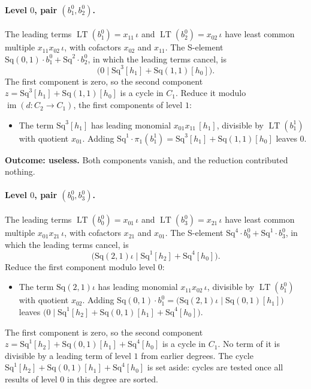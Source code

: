 \documentclass[11pt]{article}
\newcommand{\Sq}{\mathrm{Sq}}
\DeclareMathOperator{\LT}{LT}
\begin{document}
\paragraph{Level $0$, pair $(b^{0}_{1}, b^{0}_{2})$.} The leading terms $\LT(b^{0}_{1}) = x_{11}\,\iota$ and $\LT(b^{0}_{2}) = x_{02}\,\iota$ have least common multiple $x_{11}x_{02}\,\iota$, with cofactors $x_{02}$ and $x_{11}$. The S-element $\Sq(0,1)\cdot b^{0}_{1} + \Sq^{2}\cdot b^{0}_{2}$, in which the leading terms cancel, is
\[\bigl(0 \;\big|\; \Sq^{3}[h_1] + \Sq(1,1)[h_0]\bigr).\]
The first component is zero, so the second component $z = \Sq^{3}[h_1] + \Sq(1,1)[h_0]$ is a cycle in $C_{1}$.
Reduce it modulo $\operatorname{im}(d\colon C_{2}\to C_{1})$, the first components of level $1$:
\begin{itemize}
\item The term $\Sq^{3}[h_1]$ has leading monomial $x_{01}x_{11}\,[h_1]$, divisible by $\LT(b^{1}_{1})$ with quotient $x_{01}$. Adding $\Sq^{1}\cdot \pi_1(b^{1}_{1}) = \Sq^{3}[h_1] + \Sq(1,1)[h_0]$ leaves $0$.
\end{itemize}
\textbf{Outcome: useless.} Both components vanish, and the reduction contributed nothing.
\medskip
\paragraph{Level $0$, pair $(b^{0}_{0}, b^{0}_{3})$.} The leading terms $\LT(b^{0}_{0}) = x_{01}\,\iota$ and $\LT(b^{0}_{3}) = x_{21}\,\iota$ have least common multiple $x_{01}x_{21}\,\iota$, with cofactors $x_{21}$ and $x_{01}$. The S-element $\Sq^{4}\cdot b^{0}_{0} + \Sq^{1}\cdot b^{0}_{3}$, in which the leading terms cancel, is
\[\bigl(\Sq(2,1)\iota \;\big|\; \Sq^{1}[h_2] + \Sq^{4}[h_0]\bigr).\]
Reduce the first component modulo level $0$:
\begin{itemize}
\item The term $\Sq(2,1)\iota$ has leading monomial $x_{11}x_{02}\,\iota$, divisible by $\LT(b^{0}_{1})$ with quotient $x_{02}$. Adding $\Sq(0,1)\cdot b^{0}_{1} = \bigl(\Sq(2,1)\iota \;\big|\; \Sq(0,1)[h_1]\bigr)$ leaves $\bigl(0 \;\big|\; \Sq^{1}[h_2] + \Sq(0,1)[h_1] + \Sq^{4}[h_0]\bigr)$.
\end{itemize}
The first component is zero, so the second component $z = \Sq^{1}[h_2] + \Sq(0,1)[h_1] + \Sq^{4}[h_0]$ is a cycle in $C_{1}$.
No term of it is divisible by a leading term of level $1$ from earlier degrees.
The cycle $\Sq^{1}[h_2] + \Sq(0,1)[h_1] + \Sq^{4}[h_0]$ is set aside: cycles are tested once all results of level $0$ in this degree are sorted.
\medskip
\end{document}
